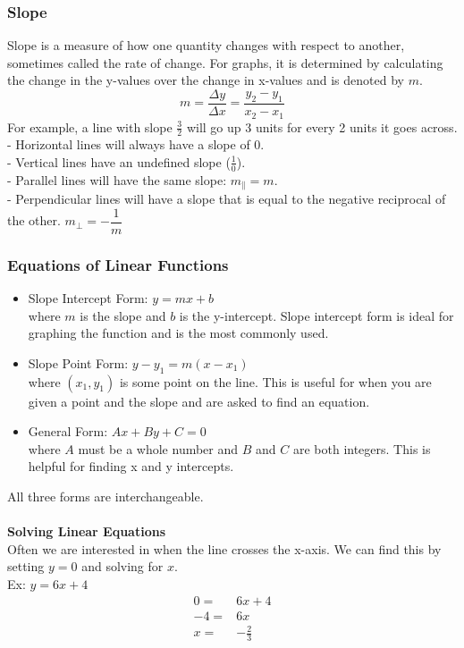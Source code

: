\documentclass[11pt, fleqn]{article}
\begin{document}
\subsubsection{Slope}
Slope is a measure of how one quantity changes with respect to another, sometimes called the rate of change. For graphs, it is determined by calculating the change in the y-values over the change in x-values and is denoted by $m$.
$$m=\frac{\Delta y}{\Delta x}=\frac{y_2-y_1}{x_2-x_1}$$
For example, a line with slope $\frac{3}{2}$ will go up 3 units for every 2 units it goes across.\\
- Horizontal lines will always have a slope of 0.\\
- Vertical lines have an undefined slope ($\frac{1}{0}$).\\
- Parallel lines will have the same slope: $m_\parallel=m$.\\
- Perpendicular lines will have a slope that is equal to the negative reciprocal of the other. ${m_\perp=-\dfrac{1}{m}}$

\subsubsection{Equations of Linear Functions}
\begin{itemize}
    \item Slope Intercept Form: $y=mx+b$\\
    where $m$ is the slope and $b$ is the y-intercept. Slope intercept form is ideal for graphing the function and is the most commonly used.
    \item Slope Point Form: $y-y_1=m(x-x_1)$\\
    where $(x_1,y_1)$ is some point on the line. This is useful for when you are given a point and the slope and are asked to find an equation.
    \item General Form: $Ax+By+C=0$\\
    where $A$ must be a whole number and $B$ and $C$ are both integers. This is helpful for finding x and y intercepts.
\end{itemize}
All three forms are interchangeable.\\
\\
\textbf{Solving Linear Equations}\\
Often we are interested in when the line crosses the x-axis. We can find this by setting $y=0$ and solving for $x$.\\
Ex: $y=6x+4$
\begin{align*}
    0=&6x+4\\
    -4=&6x\\
    x=&-\frac{2}{3}
\end{align*}
\end{document}
